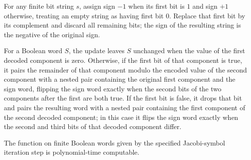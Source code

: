 \begin{theorem}
\label{Complexity.BinArith.signOf_flipSign}
\leanok
{}
For any finite bit string $s$, assign sign $-1$ when its first bit is $1$ and sign $+1$
otherwise, treating an empty string as having first bit $0$. Replace that first bit by
its complement and discard all remaining bits; the sign of the resulting string is the
negative of the original sign.
\end{theorem}

\begin{definition}
\label{Complexity.BinArith.jacStep}
\leanok
{}
For a Boolean word $S$, the update leaves $S$ unchanged when the value of the first
decoded component is zero. Otherwise, if the first bit of that component is true, it
pairs the remainder of that component modulo the encoded value of the second component
with a nested pair containing the original first component and the sign word, flipping
the sign word exactly when the second bits of the two components after the first are
both true. If the first bit is false, it drops that bit and pairs the resulting word
with a nested pair containing the first component of the second decoded component; in
this case it flips the sign word exactly when the second and third bits of that decoded
component differ.
\end{definition}

\begin{theorem}
\label{Complexity.BinArith.polyTimeComputable_jacStep}
\leanok
{}
The function on finite Boolean words given by the specified Jacobi-symbol iteration step
is polynomial-time computable.
\end{theorem}

